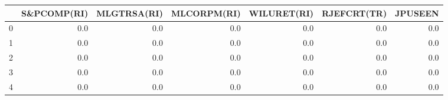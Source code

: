 \begin{tabular}{lrrrrrr}
\toprule
{} &  S\&PCOMP(RI) &  MLGTRSA(RI) &  MLCORPM(RI) &  WILURET(RI) &  RJEFCRT(TR) &  JPUSEEN \\
\midrule
0 &          0.0 &          0.0 &          0.0 &          0.0 &          0.0 &      0.0 \\
1 &          0.0 &          0.0 &          0.0 &          0.0 &          0.0 &      0.0 \\
2 &          0.0 &          0.0 &          0.0 &          0.0 &          0.0 &      0.0 \\
3 &          0.0 &          0.0 &          0.0 &          0.0 &          0.0 &      0.0 \\
4 &          0.0 &          0.0 &          0.0 &          0.0 &          0.0 &      0.0 \\
\bottomrule
\end{tabular}
